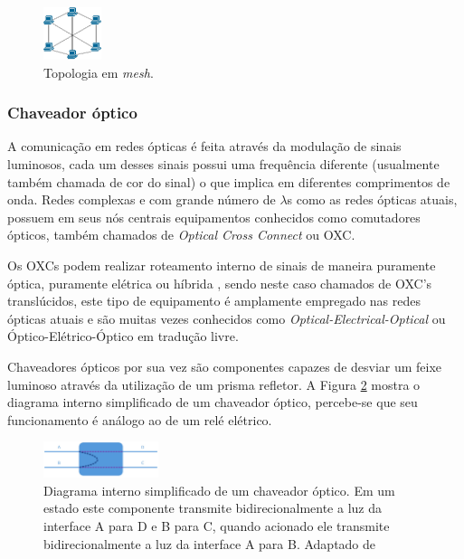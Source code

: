 \documentclass[conference]{IEEEtran}
\begin{document}
\begin{figure}[htbp]
	\centering
	\includegraphics[width=0.15\textwidth]{./figuras/Topologia-Mesh.jpg} %
	\caption{Topologia em \emph{mesh}.}
	\label{fig_topologia_multiplo_mesh}
\end{figure}

\subsubsection{Chaveador óptico}
A comunicação em redes ópticas é feita através da modulação de sinais luminosos, cada um desses sinais possui uma frequência diferente (usualmente também chamada de cor do sinal) o que implica em diferentes comprimentos de onda. Redes complexas e com grande número de $\lambda$s  como as redes ópticas atuais, possuem em seus nós centrais equipamentos conhecidos como comutadores ópticos, também chamados de \emph{Optical Cross Connect} ou OXC.

Os OXCs podem realizar roteamento interno de sinais de maneira puramente óptica, puramente elétrica ou híbrida \cite{Book-Ramaswami2010}, sendo neste caso chamados de OXC's translúcidos, este tipo de equipamento é amplamente empregado nas redes ópticas atuais e são muitas vezes conhecidos como \emph{Optical-Electrical-Optical} ou Óptico-Elétrico-Óptico em tradução livre. 

Chaveadores ópticos por sua vez são componentes capazes de desviar um feixe luminoso através da utilização de um prisma refletor. A Figura \ref{fig_chaveador_optico} mostra o diagrama interno simplificado de um chaveador óptico, percebe-se que seu funcionamento é análogo ao de um relé elétrico.

\begin{figure}[htbp]
	\centering
	\includegraphics[width=0.3\textwidth]{./figuras/Switch_optico.jpg} %
	\caption[Exemplo básico chaveador óptico]{Diagrama interno simplificado de um chaveador óptico. Em um estado este componente transmite bidirecionalmente a luz da interface A para D e B para C, quando acionado ele transmite bidirecionalmente a luz da interface A para B. Adaptado de \cite{Accelink2014}}
	\label{fig_chaveador_optico}
\end{figure}
\end{document}
